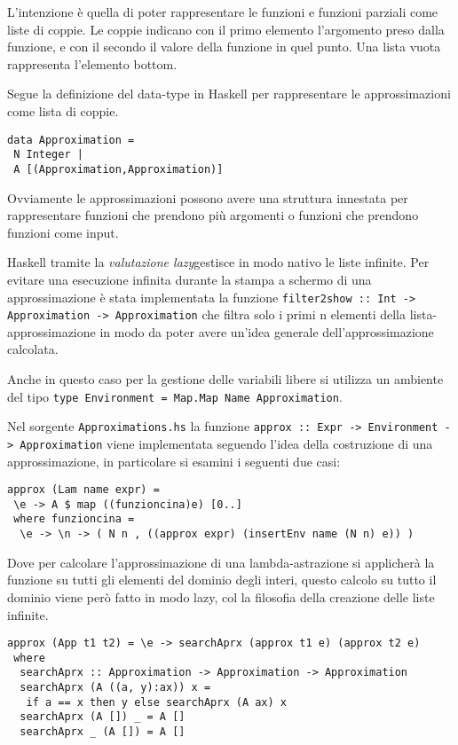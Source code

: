 \documentclass{article}
\begin{document}
L'intenzione è quella di poter rappresentare le funzioni e funzioni parziali come liste di coppie. Le coppie indicano con il primo elemento l'argomento preso dalla funzione, e con il secondo il valore della funzione in quel punto. Una lista vuota rappresenta l'elemento bottom.

Segue la definizione del data-type in Haskell per rappresentare le approssimazioni come lista di coppie.

\begin{verbatim}
data Approximation = 
 N Integer |
 A [(Approximation,Approximation)]
\end{verbatim}

Ovviamente le approssimazioni possono avere una struttura innestata per rappresentare funzioni che prendono più argomenti o funzioni che prendono funzioni come input.

Haskell tramite la \emph{valutazione lazy}gestisce in modo nativo le liste infinite.
Per evitare una esecuzione infinita durante la stampa a schermo di una approssimazione è stata implementata la funzione \texttt{filter2show :: Int -> Approximation -> Approximation} che filtra solo i primi n elementi della lista-approssimazione in modo da poter avere un'idea generale dell'approssimazione calcolata.

Anche in questo caso per la gestione delle variabili libere si utilizza un ambiente del tipo \texttt{type Environment = Map.Map Name Approximation}.

Nel sorgente \texttt{Approximations.hs} la funzione \texttt{approx :: Expr -> Environment -> Approximation} viene implementata seguendo l'idea della costruzione di una approssimazione, in particolare si esamini i seguenti due casi:

\begin{verbatim}
approx (Lam name expr) = 
 \e -> A $ map ((funzioncina)e) [0..]
 where funzioncina = 
  \e -> \n -> ( N n , ((approx expr) (insertEnv name (N n) e)) )
\end{verbatim}

Dove per calcolare l'approssimazione di una lambda-astrazione si applicherà la funzione su tutti gli elementi del dominio degli interi, questo calcolo su tutto il dominio viene però fatto in modo lazy, col la filosofia della creazione delle liste infinite.

\begin{verbatim}
approx (App t1 t2) = \e -> searchAprx (approx t1 e) (approx t2 e)
 where
  searchAprx :: Approximation -> Approximation -> Approximation
  searchAprx (A ((a, y):ax)) x =
   if a == x then y else searchAprx (A ax) x
  searchAprx (A []) _ = A []
  searchAprx _ (A []) = A []
\end{verbatim}
\end{document}
